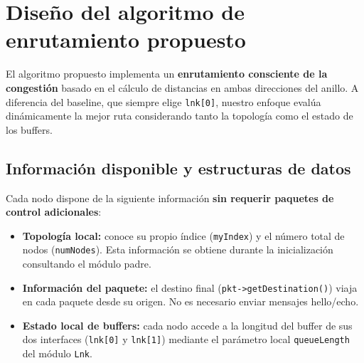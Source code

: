 \documentclass[10pt,letterpaper,twocolumn]{article}
\newcommand{\coltablesetup}{%
  \scriptsize
  \setlength{\tabcolsep}{3pt}%
  \renewcommand{\arraystretch}{1.08}%
}
\begin{document}
\begin{table}[!ht]
  \centering
  \caption{Exploración del Caso~2: métricas vs.\ \texttt{interArrivalTime}.}
  \label{tab:caso2-sweep}
  \coltablesetup
\end{table}

\FloatBarrier

\section{Diseño del algoritmo de enrutamiento propuesto}
\label{sec:diseno}

El algoritmo propuesto implementa un \textbf{enrutamiento consciente de la congestión} basado en el cálculo de distancias en ambas direcciones del anillo. A diferencia del baseline, que siempre elige \texttt{lnk[0]}, nuestro enfoque evalúa dinámicamente la mejor ruta considerando tanto la topología como el estado de los buffers.

\subsection{Información disponible y estructuras de datos}

Cada nodo dispone de la siguiente información \textbf{sin requerir paquetes de control adicionales}:

\begin{itemize}
  \item \textbf{Topología local:} conoce su propio índice (\texttt{myIndex}) y el número total de nodos (\texttt{numNodes}). Esta información se obtiene durante la inicialización consultando el módulo padre.
  
  \item \textbf{Información del paquete:} el destino final (\texttt{pkt->getDestination()}) viaja en cada paquete desde su origen. No es necesario enviar mensajes hello/echo.
  
  \item \textbf{Estado local de buffers:} cada nodo accede a la longitud del buffer de sus dos interfaces (\texttt{lnk[0]} y \texttt{lnk[1]}) mediante el parámetro local \texttt{queueLength} del módulo \texttt{Lnk}.
\end{itemize}
\end{document}
